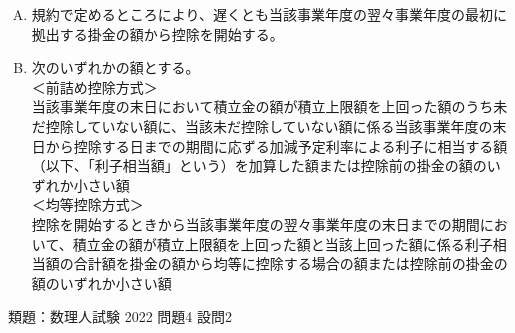 \begin{answerbox}
  \begin{enumerate}[(A)]
    \item 規約で定めるところにより、遅くとも当該事業年度の翌々事業年度の最初に拠出する掛金の額から控除を開始する。
    \\
    \item 次のいずれかの額とする。\\
＜前詰め控除方式＞\\
当該事業年度の末日において積立金の額が積立上限額を上回った額のうち未だ控除していない額に、当該未だ控除していない額に係る当該事業年度の末日から控除する日までの期間に応ずる加減予定利率による利子に相当する額（以下、「利子相当額」という）を加算した額または控除前の掛金の額のいずれか小さい額
\\
＜均等控除方式＞\\
控除を開始するときから当該事業年度の翌々事業年度の末日までの期間において、積立金の額が積立上限額を上回った額と当該上回った額に係る利子相当額の合計額を掛金の額から均等に控除する場合の額または控除前の掛金の額のいずれか小さい額
  \end{enumerate}
  
\end{answerbox}

\begin{explanationbox}
  類題：数理人試験 2022 問題4 設問2
\end{explanationbox}

